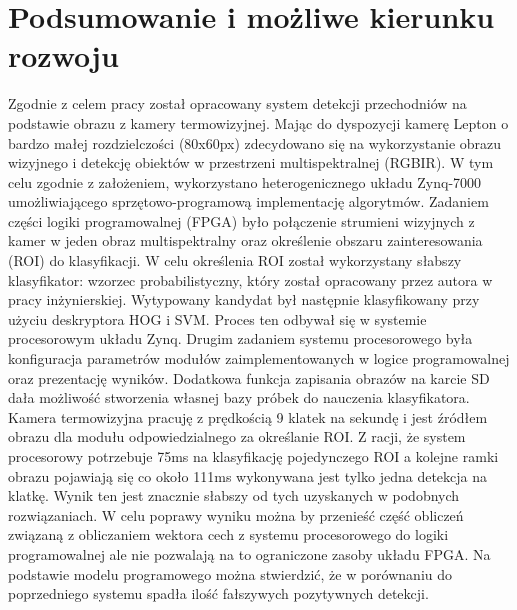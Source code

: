 \chapter{Podsumowanie i możliwe kierunku rozwoju}
Zgodnie z celem pracy został opracowany system detekcji przechodniów na podstawie obrazu z kamery termowizyjnej. Mając do dyspozycji kamerę Lepton o bardzo małej rozdzielczości (80x60px) zdecydowano się na wykorzystanie obrazu wizyjnego i detekcję obiektów w przestrzeni multispektralnej (RGBIR). W tym celu zgodnie z założeniem, wykorzystano heterogenicznego układu Zynq-7000 umożliwiającego sprzętowo-programową implementację algorytmów. Zadaniem części logiki programowalnej (FPGA) było połączenie strumieni wizyjnych z kamer w jeden obraz multispektralny oraz określenie obszaru zainteresowania (ROI) do klasyfikacji. W celu określenia ROI został wykorzystany słabszy klasyfikator: wzorzec probabilistyczny, który został opracowany przez autora w pracy inżynierskiej. Wytypowany kandydat był następnie klasyfikowany przy użyciu deskryptora HOG i SVM. Proces ten odbywał się w systemie procesorowym układu Zynq. Drugim zadaniem systemu procesorowego była konfiguracja parametrów modułów zaimplementowanych w logice programowalnej oraz prezentację wyników. Dodatkowa funkcja zapisania obrazów na karcie SD dała możliwość stworzenia własnej bazy próbek do nauczenia klasyfikatora.
Kamera termowizyjna pracuję z prędkością 9 klatek na sekundę i jest źródłem obrazu dla modułu odpowiedzialnego za określanie ROI. Z racji, że system procesorowy potrzebuje 75ms na klasyfikację pojedynczego ROI a kolejne ramki obrazu pojawiają się co około 111ms wykonywana jest tylko jedna detekcja na klatkę. Wynik ten jest znacznie słabszy od tych uzyskanych w podobnych rozwiązaniach. W celu poprawy wyniku można by przenieść część obliczeń związaną z obliczaniem wektora cech z systemu procesorowego do logiki programowalnej ale nie pozwalają na to ograniczone zasoby układu FPGA. Na podstawie modelu programowego można stwierdzić, że w porównaniu do
poprzedniego systemu spadła ilość fałszywych pozytywnych detekcji.